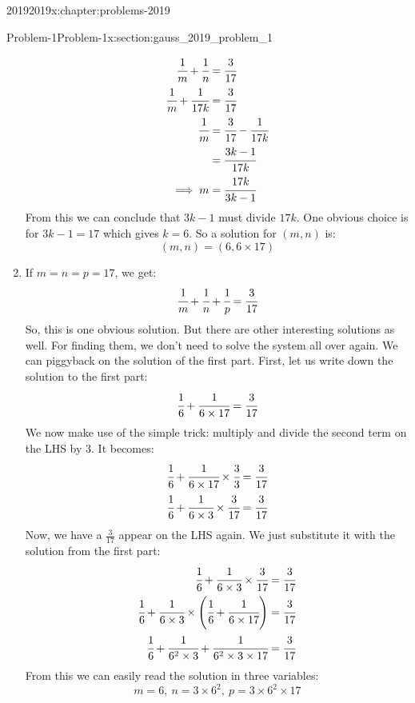 \documentclass[oneside,10pt,]{book}
\numberwithin{equation}{section}
\newcommand{\amp}{&}
\begin{document}
\begin{chapterptx}{2019}{}{2019}{}{}{x:chapter:problems-2019}
\begin{sectionptx}{Problem-1}{}{Problem-1}{}{}{x:section:gauss_2019_problem_1}
\begin{enumerate}
\begin{align*}
\cfrac{1}{m} + \cfrac{1}{n} \amp= \cfrac{3}{17}\\
\cfrac{1}{m} + \cfrac{1}{17k} \amp= \cfrac{3}{17}\\
\cfrac{1}{m} \amp= \cfrac{3}{17} - \cfrac{1}{17k}\\
\amp= \cfrac{3k - 1}{17k}\\
\implies m \amp= \cfrac{17k}{3k - 1}
\end{align*}
From this we can conclude that \(3k - 1\) must divide \(17k\). One obvious choice is for \(3k - 1 = 17\) which gives \(k = 6\). So a solution for \((m, n)\) is:%
\begin{equation*}
(m, n) = (6, 6 \times 17)
\end{equation*}
%
\item{}If \(m = n = p = 17\), we get:%
\begin{equation*}
\cfrac{1}{m} + \cfrac{1}{n} + \cfrac{1}{p} = \cfrac{3}{17}
\end{equation*}
So, this is one obvious solution. But there are other interesting solutions as well. For finding them, we don't need to solve the system all over again. We can piggyback on the solution of the first part. First, let us write down the solution to the first part:%
\begin{equation*}
\cfrac{1}{6} + \cfrac{1}{6 \times 17} = \cfrac{3}{17}
\end{equation*}
We now make use of the simple trick: multiply and divide the second term on the LHS by \(3\). It becomes:%
\begin{align*}
\cfrac{1}{6} + \cfrac{1}{6 \times 17} \times \cfrac{3}{3} \amp= \cfrac{3}{17}\\
\cfrac{1}{6} + \cfrac{1}{6 \times 3} \times \cfrac{3}{17} \amp= \cfrac{3}{17}
\end{align*}
Now, we have a \(\frac{3}{17}\) appear on the LHS again. We just substitute it with the solution from the first part:%
\begin{align*}
\cfrac{1}{6} + \cfrac{1}{6 \times 3} \times \cfrac{3}{17} \amp= \cfrac{3}{17}\\
\cfrac{1}{6} + \cfrac{1}{6 \times 3} \times \Bigg( \cfrac{1}{6} + \cfrac{1}{6 \times 17} \Bigg) \amp= \cfrac{3}{17}\\
\cfrac{1}{6} + \cfrac{1}{6^2 \times 3} + \cfrac{1}{6^2 \times 3 \times 17}  \amp= \cfrac{3}{17}
\end{align*}
From this we can easily read the solution in three variables:%
\begin{equation*}
m = 6,\ n = 3 \times 6^2,\ p = 3 \times 6^2 \times 17

\end{equation*}
\end{enumerate}
\end{sectionptx}
\end{chapterptx}
\end{document}
